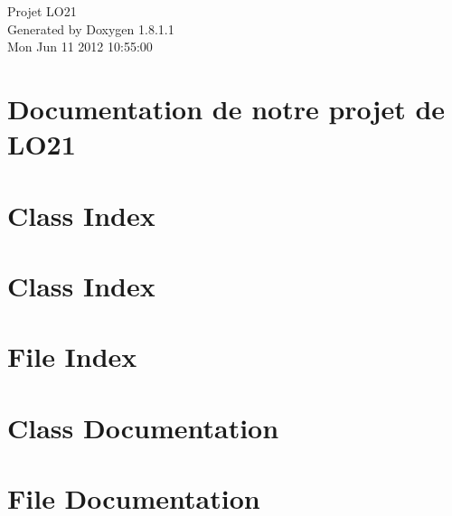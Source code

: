 \documentclass{book}
\begin{document}
\hypersetup{pageanchor=false,citecolor=blue}
\begin{titlepage}
\vspace*{7cm}
\begin{center}
{\Large Projet L\-O21 }\\
\vspace*{1cm}
{\large Generated by Doxygen 1.8.1.1}\\
\vspace*{0.5cm}
{\small Mon Jun 11 2012 10:55:00}\\
\end{center}
\end{titlepage}
\clearemptydoublepage
{}
\tableofcontents
\clearemptydoublepage
{}
\hypersetup{pageanchor=true,citecolor=blue}
\chapter{Documentation de notre projet de L\-O21}
\label{index}\hypertarget{index}{}
\chapter{Class Index}

\chapter{Class Index}

\chapter{File Index}

\chapter{Class Documentation}
















\chapter{File Documentation}






\printindex
\end{document}
